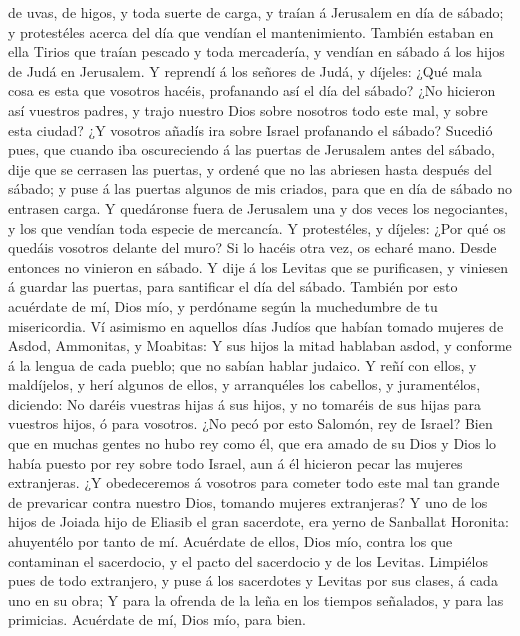 de uvas, de higos, y toda suerte de carga, y traían á Jerusalem en día
de sábado; y protestéles acerca del día que vendían el mantenimiento.
 También estaban en ella Tirios que traían pescado y toda
mercadería, y vendían en sábado á los hijos de Judá en Jerusalem.
 Y reprendí á los señores de Judá, y díjeles: ¿Qué mala
cosa es esta que vosotros hacéis, profanando así el día del sábado?
 ¿No hicieron así vuestros padres, y trajo nuestro Dios
sobre nosotros todo este mal, y sobre esta ciudad? ¿Y vosotros añadís
ira sobre Israel profanando el sábado?  Sucedió pues, que
cuando iba oscureciendo á las puertas de Jerusalem antes del sábado,
dije que se cerrasen las puertas, y ordené que no las abriesen hasta
después del sábado; y puse á las puertas algunos de mis criados, para
que en día de sábado no entrasen carga.  Y quedáronse fuera
de Jerusalem una y dos veces los negociantes, y los que vendían toda
especie de mercancía.  Y protestéles, y díjeles: ¿Por qué
os quedáis vosotros delante del muro? Si lo hacéis otra vez, os echaré
mano. Desde entonces no vinieron en sábado.  Y dije á los
Levitas que se purificasen, y viniesen á guardar las puertas, para
santificar el día del sábado. También por esto acuérdate de mí, Dios
mío, y perdóname según la muchedumbre de tu misericordia. 
Ví asimismo en aquellos días Judíos que habían tomado mujeres de Asdod,
Ammonitas, y Moabitas:  Y sus hijos la mitad hablaban
asdod, y conforme á la lengua de cada pueblo; que no sabían hablar
judaico.  Y reñí con ellos, y maldíjelos, y herí algunos de
ellos, y arranquéles los cabellos, y juramentélos, diciendo: No daréis
vuestras hijas á sus hijos, y no tomaréis de sus hijas para vuestros
hijos, ó para vosotros.  ¿No pecó por esto Salomón, rey de
Israel? Bien que en muchas gentes no hubo rey como él, que era amado de
su Dios y Dios lo había puesto por rey sobre todo Israel, aun á él
hicieron pecar las mujeres extranjeras.  ¿Y obedeceremos á
vosotros para cometer todo este mal tan grande de prevaricar contra
nuestro Dios, tomando mujeres extranjeras?  Y uno de los
hijos de Joiada hijo de Eliasib el gran sacerdote, era yerno de
Sanballat Horonita: ahuyentélo por tanto de mí.  Acuérdate
de ellos, Dios mío, contra los que contaminan el sacerdocio, y el pacto
del sacerdocio y de los Levitas.  Limpiélos pues de todo
extranjero, y puse á los sacerdotes y Levitas por sus clases, á cada uno
en su obra;  Y para la ofrenda de la leña en los tiempos
señalados, y para las primicias. Acuérdate de mí, Dios mío, para bien.
